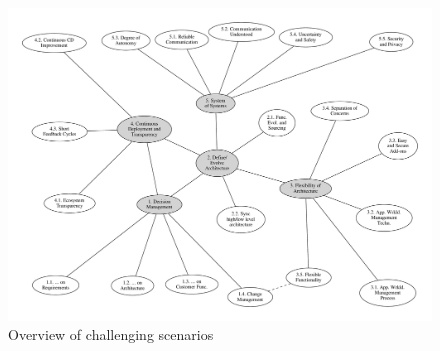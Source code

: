 \begin{figure}[htb]
\begin{center}
\includegraphics[width=\textwidth]{figures/use_cases}
\caption{Overview of challenging scenarios}
\label{fig:challenging-scenarios}
\end{center}
\end{figure}


